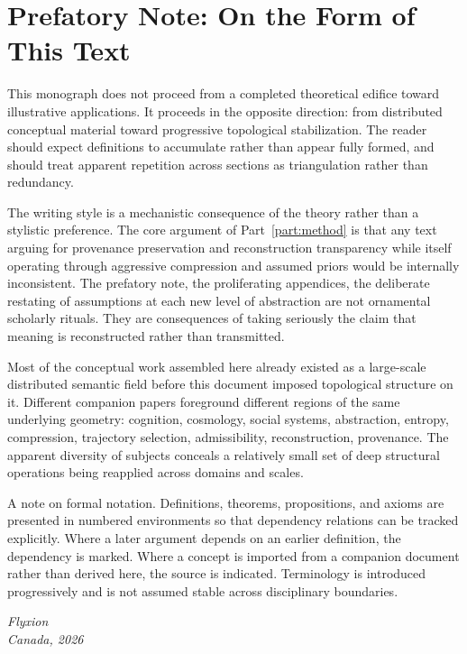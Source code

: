 \chapter*{Prefatory Note: On the Form of This Text}

This monograph does not proceed from a completed theoretical edifice toward illustrative
applications. It proceeds in the opposite direction: from distributed conceptual material toward
progressive topological stabilization. The reader should expect definitions to accumulate rather
than appear fully formed, and should treat apparent repetition across sections as triangulation
rather than redundancy.

The writing style is a mechanistic consequence of the theory rather than a stylistic preference.
The core argument of Part~\ref{part:method} is that any text arguing for provenance preservation
and reconstruction transparency while itself operating through aggressive compression and assumed
priors would be internally inconsistent. The prefatory note, the proliferating appendices, the
deliberate restating of assumptions at each new level of abstraction are not ornamental scholarly
rituals. They are consequences of taking seriously the claim that meaning is reconstructed rather
than transmitted.

Most of the conceptual work assembled here already existed as a large-scale distributed semantic
field before this document imposed topological structure on it. Different companion papers
foreground different regions of the same underlying geometry: cognition, cosmology, social
systems, abstraction, entropy, compression, trajectory selection, admissibility, reconstruction,
provenance. The apparent diversity of subjects conceals a relatively small set of deep structural
operations being reapplied across domains and scales.

A note on formal notation. Definitions, theorems, propositions, and axioms are presented in
numbered environments so that dependency relations can be tracked explicitly. Where a later
argument depends on an earlier definition, the dependency is marked. Where a concept is
imported from a companion document rather than derived here, the source is indicated.
Terminology is introduced progressively and is not assumed stable across disciplinary
boundaries.

\vspace{1cm}
\begin{flushright}
\itshape Flyxion\\
Canada, 2026
\end{flushright}
\cleardoublepage
